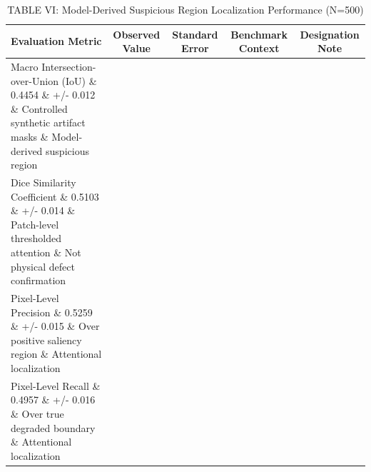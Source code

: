 \begin{table}[t]
\centering
\caption{TABLE VI: Model-Derived Suspicious Region Localization Performance (N=500)}
\label{tab:table6_localization_performance}
\begin{tabular}{lcccc}
\hline
\textbf{Evaluation Metric} & \textbf{Observed Value} & \textbf{Standard Error} & \textbf{Benchmark Context} & \textbf{Designation Note} \\
\hline
Macro Intersection-over-Union (IoU) \& 0.4454 \& +/- 0.012 \& Controlled synthetic artifact masks \& Model-derived suspicious region \\
Dice Similarity Coefficient \& 0.5103 \& +/- 0.014 \& Patch-level thresholded attention \& Not physical defect confirmation \\
Pixel-Level Precision \& 0.5259 \& +/- 0.015 \& Over positive saliency region \& Attentional localization \\
Pixel-Level Recall \& 0.4957 \& +/- 0.016 \& Over true degraded boundary \& Attentional localization \\
\hline
\end{tabular}
\end{table}
